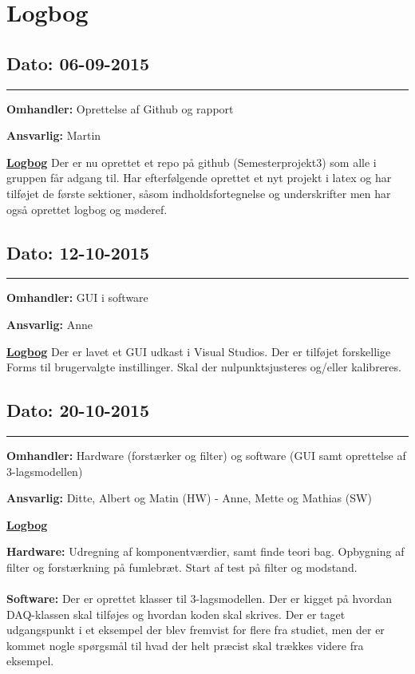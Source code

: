 \chapter{Logbog}

\section{Dato: 06-09-2015}
\hrule
\textbf{Omhandler:} Oprettelse af Github og rapport

\textbf{Ansvarlig:} Martin

\underline{\textbf{Logbog}}
Der er nu oprettet et repo på github (Semesterprojekt3) som alle i gruppen får adgang til. Har efterfølgende oprettet et nyt projekt i latex og har tilføjet de første sektioner, såsom indholdsfortegnelse og underskrifter men har også oprettet logbog og møderef.

\section{Dato: 12-10-2015}
\hrule
\textbf{Omhandler:} GUI i software 

\textbf{Ansvarlig:} Anne

\underline{\textbf{Logbog}}
Der er lavet et GUI udkast i Visual Studios. Der er tilføjet forskellige Forms til brugervalgte instillinger. Skal der nulpunktsjusteres og/eller kalibreres.

\section{Dato: 20-10-2015}
\hrule
\textbf{Omhandler:} Hardware (forstærker og filter) og software (GUI samt oprettelse af 3-lagsmodellen) 

\textbf{Ansvarlig:} Ditte, Albert og Matin (HW) - Anne, Mette og Mathias (SW)

\underline{\textbf{Logbog}}

\textbf{Hardware:} Udregning af komponentværdier, samt finde teori bag. Opbygning af filter og forstærkning på fumlebræt. Start af test på filter og modstand. \\
\\ 
\textbf{Software:} Der er oprettet klasser til 3-lagsmodellen. Der er kigget på hvordan DAQ-klassen skal tilføjes og hvordan koden skal skrives. Der er taget udgangspunkt i et eksempel der blev fremvist for flere fra studiet, men der er kommet nogle spørgsmål til hvad der helt præcist skal trækkes videre fra eksempel.

